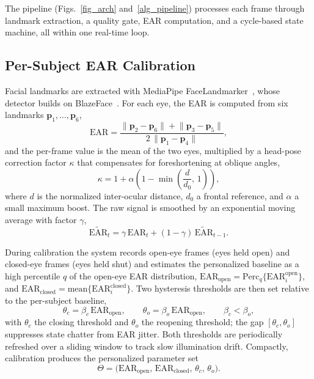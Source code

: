 \documentclass{IEEE_lsens}
\begin{document}
The pipeline (Figs.~\ref{fig_arch} and~\ref{alg_pipeline}) processes each
frame through landmark extraction, a quality gate, EAR computation, and a
cycle-based state machine, all within one real-time loop.

\subsection{Per-Subject EAR Calibration}
Facial landmarks are extracted with MediaPipe
FaceLandmarker~\cite{lugaresi2019}, whose detector builds on
BlazeFace~\cite{bazarevsky2019}. For each eye, the EAR is computed from six
landmarks $\bm{p}_1,\dots,\bm{p}_6$,
\begin{equation}
\mathrm{EAR}=\frac{\lVert \bm{p}_2-\bm{p}_6\rVert+\lVert \bm{p}_3-\bm{p}_5\rVert}
{2\,\lVert \bm{p}_1-\bm{p}_4\rVert},
\label{eq_ear}
\end{equation}
and the per-frame value is the mean of the two eyes, multiplied by a head-pose
correction factor $\kappa$ that compensates for foreshortening at oblique
angles,
\begin{equation}
\kappa = 1 + \alpha\left(1 - \min\!\left(\frac{d}{d_0},\,1\right)\right),
\label{eq_kappa}
\end{equation}
where $d$ is the normalized inter-ocular distance, $d_0$ a frontal reference,
and $\alpha$ a small maximum boost. The raw signal is smoothed by an
exponential moving average with factor $\gamma$,
\begin{equation}
\widetilde{\mathrm{EAR}}_t=\gamma\,\mathrm{EAR}_t+(1-\gamma)\,\widetilde{\mathrm{EAR}}_{t-1}.
\label{eq_ema}
\end{equation}

During calibration the system records open-eye frames (eyes held open) and
closed-eye frames (eyes held shut) and estimates the personalized baseline as a
high percentile $q$ of the open-eye EAR distribution,
$\mathrm{EAR}_{\text{open}}=\mathrm{Perc}_q\{\mathrm{EAR}_i^{\text{open}}\}$, and
$\mathrm{EAR}_{\text{closed}}=\mathrm{mean}\{\mathrm{EAR}_i^{\text{closed}}\}$.
Two hysteresis thresholds are then set relative to the per-subject baseline,
\begin{equation}
\theta_c=\beta_c\,\mathrm{EAR}_{\text{open}},\qquad
\theta_o=\beta_o\,\mathrm{EAR}_{\text{open}},\qquad \beta_c<\beta_o,
\label{eq_thresh}
\end{equation}
with $\theta_c$ the closing threshold and $\theta_o$ the reopening threshold;
the gap $[\theta_c,\theta_o]$ suppresses state chatter from EAR jitter. Both
thresholds are periodically refreshed over a sliding window to track slow
illumination drift. Compactly, calibration produces the personalized parameter
set
\begin{equation}
\Theta=\big(\mathrm{EAR}_{\text{open}},\,\mathrm{EAR}_{\text{closed}},\,\theta_c,\,\theta_o\big).
\label{eq_calib}
\end{equation}
\end{document}

